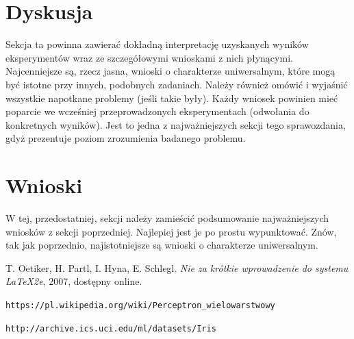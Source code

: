 \documentclass{classrep}
\begin{document}
\section{Dyskusja}
{\color{blue}
Sekcja ta powinna zawierać dokładną interpretację uzyskanych wyników
eksperymentów wraz ze szczegółowymi wnioskami z nich płynącymi. Najcenniejsze
są, rzecz jasna, wnioski o charakterze uniwersalnym, które mogą być istotne
przy innych, podobnych zadaniach. Należy również omówić i wyjaśnić wszystkie
napotkane problemy (jeśli takie były). Każdy wniosek powinien mieć poparcie we
wcześniej przeprowadzonych eksperymentach (odwołania do konkretnych wyników).
Jest to jedna z najważniejszych sekcji tego sprawozdania, gdyż prezentuje
poziom zrozumienia badanego problemu.}

\section{Wnioski}
{\color{blue}
W tej, przedostatniej, sekcji należy zamieścić podsumowanie najważniejszych
wniosków z sekcji poprzedniej. Najlepiej jest je po prostu wypunktować. Znów,
tak jak poprzednio, najistotniejsze są wnioski o charakterze uniwersalnym.}

\begin{thebibliography}{0}
   T. Oetiker, H. Partl, I. Hyna, E. Schlegl.
    \textsl{Nie za krótkie wprowadzenie do systemu \LaTeX2e}, 2007, dostępny
    online.

\texttt{https://pl.wikipedia.org/wiki/Perceptron\_wielowarstwowy}

\texttt{http://archive.ics.uci.edu/ml/datasets/Iris}



\end{thebibliography}
\end{document}
